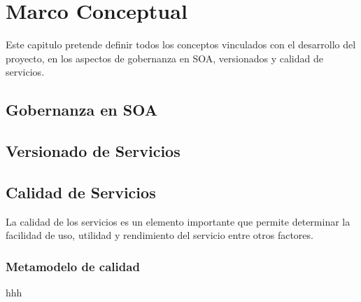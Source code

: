 \documentclass[a4paper,openright,12pt]{report}
\begin{document}
\chapter{Marco Conceptual}
Este capitulo pretende definir todos los conceptos vinculados con el desarrollo del proyecto, en los aspectos de gobernanza en SOA, versionados y calidad de servicios.
\section{Gobernanza en SOA}
\section{Versionado de Servicios}
\section{Calidad de Servicios}
La calidad de los servicios es un elemento importante que permite determinar la facilidad de uso, utilidad y rendimiento del servicio entre otros factores.
\subsection{Metamodelo de calidad}
hhh



\end{document}
